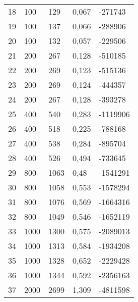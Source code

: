 \begin{longtable}{lllll}
    18               & 100            & 129            & 0,067       & -271743         \\
    19               & 100            & 137            & 0,066       & -288906         \\
    20               & 100            & 132            & 0,057       & -229506         \\
    21               & 200            & 267            & 0,128       & -510185         \\
    22               & 200            & 269            & 0,123       & -515136         \\
    23               & 200            & 269            & 0,124       & -444357         \\
    24               & 200            & 267            & 0,128       & -393278         \\
    25               & 400            & 540            & 0,283       & -1119906        \\
    26               & 400            & 518            & 0,225       & -788168         \\
    27               & 400            & 538            & 0,284       & -895704         \\
    28               & 400            & 526            & 0,494       & -733645         \\
    29               & 800            & 1063           & 0,48        & -1541291        \\
    30               & 800            & 1058           & 0,553       & -1578294        \\
    31               & 800            & 1076           & 0,569       & -1664316        \\
    32               & 800            & 1049           & 0,546       & -1652119        \\
    33               & 1000           & 1300           & 0,575       & -2089013        \\
    34               & 1000           & 1313           & 0,584       & -1934208        \\
    35               & 1000           & 1328           & 0,652       & -2229428        \\
    36               & 1000           & 1344           & 0,592       & -2356163        \\
    37               & 2000           & 2699           & 1,309       & -4811598        \\

\end{longtable}
